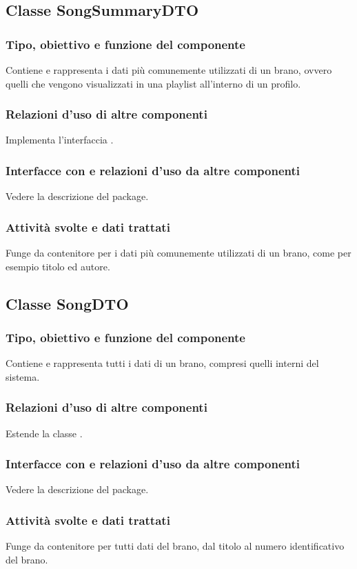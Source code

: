 \subsection{Classe SongSummaryDTO}
\subsubsection*{Tipo, obiettivo e funzione del componente}
Contiene e rappresenta i dati pi\`u comunemente utilizzati di un brano, ovvero
quelli che vengono visualizzati in una playlist all'interno di un profilo.
\subsubsection*{Relazioni d'uso di altre componenti}
Implementa l'interfaccia .
\subsubsection*{Interfacce con e relazioni d'uso da altre componenti}
Vedere la descrizione del package.
\subsubsection*{Attivit\`a svolte e dati trattati}
Funge da contenitore per i dati pi\`u comunemente utilizzati di un brano, come
per esempio titolo ed autore.

\subsection{Classe SongDTO}
\subsubsection*{Tipo, obiettivo e funzione del componente}
Contiene e rappresenta tutti i dati di un brano, compresi quelli interni del
sistema. 
\subsubsection*{Relazioni d'uso di altre componenti}
Estende la classe .
\subsubsection*{Interfacce con e relazioni d'uso da altre componenti}
Vedere la descrizione del package.
\subsubsection*{Attivit\`a svolte e dati trattati}
Funge da contenitore per tutti dati del brano, dal titolo al numero
identificativo del brano. 

